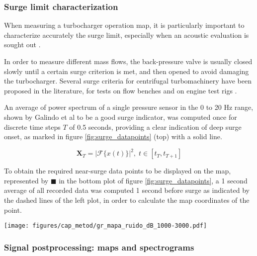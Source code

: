 \subsubsection{Surge limit characterization}
\label{sub:surge_limit_characterization}

When measuring a turbocharger operation map, it is particularly important to  characterize accurately the surge limit, especially when an acoustic evaluation is sought out \cite{galindo2006surge}.

In order to measure different mass flows, the back-pressure valve is usually closed slowly until a certain surge criterion is met, and then opened to avoid damaging the turbocharger. Several surge criteria for centrifugal turbomachinery have been proposed in the literature, for tests on flow benches \cite{galindo2006surge} and on engine test rigs \cite{galindo2013engine}.

An average of power spectrum of a single pressure sensor in the 0 to 20 Hz range, shown by Galindo et al \cite{galindo2006surge} to be a good surge indicator, was computed once for discrete time steps $T$ of 0.5 seconds, providing a clear indication of deep surge onset, as marked in figure \ref{fig:surge_datapoints} (top) with a solid line.

\begin{equation}
 \mathbf X_T=\left|\mathcal F\{x(t)\}\right|^2,\; t\in[t_T,t_{T+1}]
\end{equation}

To obtain the required near-surge data points to be displayed on the map, represented by $\blacksquare$ in the bottom plot of figure \ref{fig:surge_datapoints}, a 1 second average of all recorded data was computed 1 second before surge as indicated by the dashed lines of the left plot, in order to calculate the map coordinates of the point.

\begin{figure*}[t!]
\centering
\texttt{[image: figures/cap\_metod/gr\_mapa\_ruido\_dB\_1000-3000.pdf]}
\caption{Sample of noise level in the 1 -- 3 kHz band obtained through the processing described in subsection \ref{sub:noise_maps_and_spectrograms}, including the measured data points $(\circ)$ and the paths later expanded as spectrograms shown in figure \ref{fig:spec50-5k}. The left hand side map represents the inlet duct, whereas the right hand side map represents the outlet duct. }
\label{fig:map1k-3k}
\end{figure*}

\subsubsection{Signal postprocessing: maps and spectrograms}
\label{sub:noise_maps_and_spectrograms}

